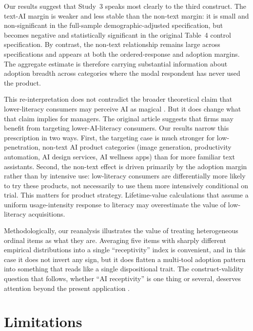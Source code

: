 \documentclass[11pt]{article}
\begin{document}
Our results suggest that Study~3 speaks most clearly to the third construct.
The text-AI margin is weaker and less stable than the non-text margin: it is
small and non-significant in the full-sample demographic-adjusted specification,
but becomes negative and statistically significant in the original Table~4
control specification. By contrast, the non-text relationship remains large
across specifications and appears at both the ordered-response and adoption
margins. The aggregate estimate is therefore carrying substantial information
about adoption breadth across categories where the modal respondent has never
used the product.

This re-interpretation does not contradict the broader theoretical claim
that lower-literacy consumers may perceive AI as magical
\citep{tully2025lower}. But it does change what that claim implies for
managers. The original article suggests that firms may benefit from targeting
lower-AI-literacy consumers. Our results narrow this prescription in two ways.
First, the targeting case is much stronger for low-penetration, non-text AI product categories
(image generation, productivity automation, AI design services, AI
wellness apps) than for more familiar text assistants. Second, the
non-text effect is driven primarily by the adoption margin rather than
by intensive use: low-literacy consumers are differentially more likely
to try these products, not necessarily to use them more
intensively conditional on trial. This matters for product strategy.
Lifetime-value calculations that assume a uniform usage-intensity
response to literacy may overestimate the value of low-literacy
acquisitions.

Methodologically, our reanalysis illustrates the value of treating
heterogeneous ordinal items as what they are. Averaging five items with
sharply different empirical distributions into a single ``receptivity''
index is convenient, and in this case it does not invert any sign, but
it does flatten a multi-tool adoption pattern into something that reads
like a single dispositional trait. The construct-validity question that
follows, whether ``AI receptivity'' is one thing or several, deserves
attention beyond the present application
\citep{long2020aileiteracy,ng2021conceptualizing}.

\section{Limitations}
\end{document}
